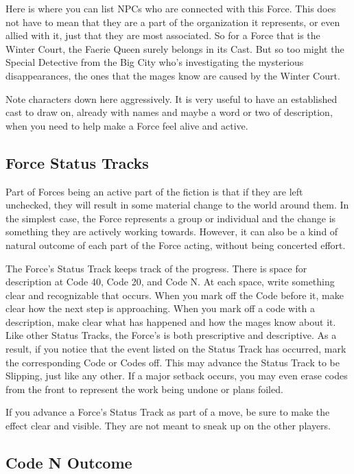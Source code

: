 \documentclass[
  oneside,
  statementpaper,
  9pt]{memoir}
\begin{document}
Here is where you can list NPCs who are connected with this Force. This
does not have to mean that they are a part of the organization it
represents, or even allied with it, just that they are most associated.
So for a Force that is the Winter Court, the Faerie Queen surely belongs
in its Cast. But so too might the Special Detective from the Big City
who's investigating the mysterious disappearances, the ones that the
mages know are caused by the Winter Court.

Note characters down here aggressively. It is very useful to have an
established cast to draw on, already with names and maybe a word or two
of description, when you need to help make a Force feel alive and
active.

\hypertarget{force-status-tracks}{%
\subsection{Force Status Tracks}\label{force-status-tracks}}

Part of Forces being an active part of the fiction is that if they are
left unchecked, they will result in some material change to the world
around them. In the simplest case, the Force represents a group or
individual and the change is something they are actively working
towards. However, it can also be a kind of natural outcome of each part
of the Force acting, without being concerted effort.

The Force's Status Track keeps track of the progress. There is space for
description at Code 40, Code 20, and Code N. At each space, write
something clear and recognizable that occurs. When you mark off the Code
before it, make clear how the next step is approaching. When you mark
off a code with a description, make clear what has happened and how the
mages know about it. Like other Status Tracks, the Force's is both
prescriptive and descriptive. As a result, if you notice that the event
listed on the Status Track has occurred, mark the corresponding Code or
Codes off. This may advance the Status Track to be Slipping, just like
any other. If a major setback occurs, you may even erase codes from the
front to represent the work being undone or plans foiled.

If you advance a Force's Status Track as part of a move, be sure to make
the effect clear and visible. They are not meant to sneak up on the
other players.

\hypertarget{code-n-outcome}{%
\subsection{Code N Outcome}\label{code-n-outcome}}
\end{document}
